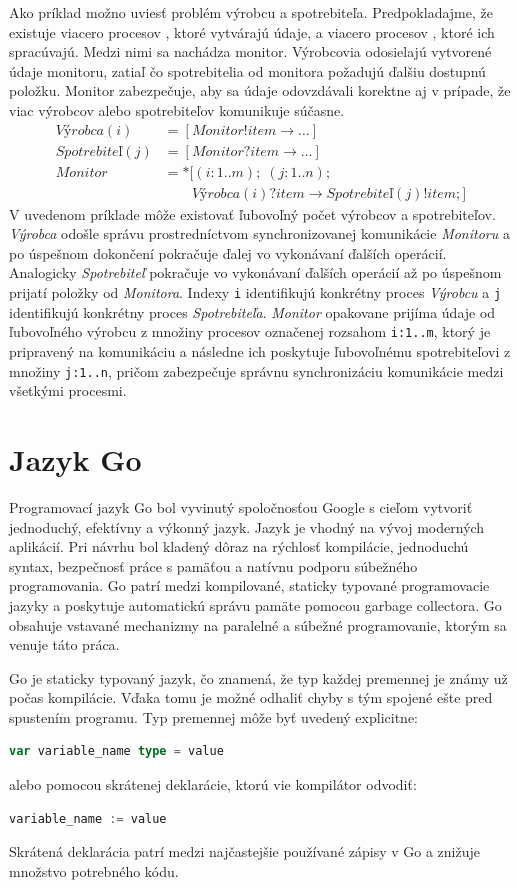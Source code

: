 \documentclass[
  biblatex,
  seconds=true,
  language=slovak,
  figures=false,
  urldate=iso,
  glossaries,
  index
]{kidiplom}
\begin{document}
Ako príklad možno uviesť problém výrobcu a spotrebiteľa. Predpokladajme, že existuje viacero procesov , ktoré vytvárajú údaje, a viacero procesov , ktoré ich spracúvajú. Medzi nimi sa nachádza monitor. Výrobcovia odosielajú vytvorené údaje monitoru, zatiaľ čo spotrebitelia od monitora požadujú ďalšiu dostupnú položku. Monitor zabezpečuje, aby sa údaje odovzdávali korektne aj v prípade, že viac výrobcov alebo spotrebiteľov komunikuje súčasne.
\[
\begin{aligned}
Výrobca(i) &= [Monitor!item \rightarrow \dots] \\
Spotrebiteľ(j) &= [Monitor?item \rightarrow \dots] \\
Monitor &= *[
    (i:1..m);\;
    (j:1..n); \\
&\qquad
    Výrobca(i)?item
    \rightarrow
    Spotrebiteľ(j)!item;
]
\end{aligned}
\]
V uvedenom príklade môže existovať ľubovoľný počet výrobcov a spotrebiteľov. \emph{Výrobca} odošle správu prostredníctvom synchronizovanej komunikácie \emph{Monitoru} a po úspešnom dokončení pokračuje ďalej vo vykonávaní ďalších operácií. Analogicky \emph{Spotrebiteľ} pokračuje vo vykonávaní ďalších operácií až po úspešnom prijatí položky od \emph{Monitora}. Indexy \texttt{i} identifikujú konkrétny proces \emph{Výrobcu} a \texttt{j} identifikujú konkrétny proces \emph{Spotrebiteľa}. \emph{Monitor} opakovane prijíma údaje od ľubovoľného výrobcu z množiny procesov označenej rozsahom \texttt{i:1..m}, ktorý je pripravený na komunikáciu a následne ich poskytuje ľubovoľnému spotrebiteľovi z množiny \texttt{j:1..n}, pričom zabezpečuje správnu synchronizáciu komunikácie medzi všetkými procesmi.

\newpage
\section{Jazyk Go}

Programovací jazyk Go bol vyvinutý spoločnosťou Google s cieľom vytvoriť jednoduchý, efektívny a výkonný
jazyk. Jazyk je vhodný na vývoj moderných aplikácií. Pri návrhu bol kladený dôraz na rýchlosť kompilácie, jednoduchú syntax, bezpečnosť práce s pamäťou a natívnu podporu súbežného programovania.
Go patrí medzi kompilované, staticky typované programovacie jazyky a poskytuje automatickú
správu pamäte pomocou garbage collectora. \cite{baugh2010go}
Go obsahuje vstavané mechanizmy na paralelné a súbežné programovanie, ktorým sa venuje táto práca.

Go je staticky typovaný jazyk, čo znamená, že typ každej premennej je známy už počas kompilácie.
Vďaka tomu je možné odhaliť chyby s tým spojené ešte pred spustením programu.
Typ premennej môže byť uvedený explicitne:
\begin{lstlisting}[language=Go]
	var variable_name type = value	
\end{lstlisting}
alebo pomocou skrátenej deklarácie, ktorú vie kompilátor odvodiť:
\begin{lstlisting}[language=Go]
	variable_name := value
\end{lstlisting}
Skrátená deklarácia patrí medzi najčastejšie používané zápisy v Go a znižuje množstvo potrebného kódu. \cite{baugh2010go}
\end{document}

